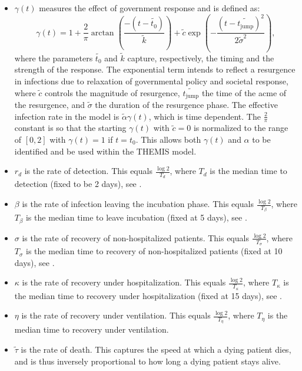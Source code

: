 \documentclass[msom,blindrev]{informs3} %
\begin{document}
\begin{APPENDICES}
\begin{itemize}[topsep=0pt,itemsep=0pt]
    \item $\gamma(t)$ measures the effect of government response and is defined as:
    \[\gamma(t)=1 + \frac{2}{\pi}\arctan\left(\frac{-(t-\widetilde{t_0})}{\widetilde{k}}\right) + \widetilde{c}\exp\left(-\frac{(t-\widetilde{t_\text{jump}})^2}{2\widetilde{\sigma}^2}\right), \]
    where the parameters $\widetilde{t_0}$ and $\widetilde{k}$ capture, respectively, the timing and the strength of the response. The exponential term intends to reflect a resurgence in infections due to relaxation of governmental policy and societal response, where $\widetilde{c}$ controls the magnitude of resurgence, $\widetilde{t_\text{jump}}$ the time of the acme of the resurgence, and $\widetilde{\sigma}$ the duration of the resurgence phase.  The effective infection rate in the model is $\widetilde{\alpha}\gamma(t)$, which is time dependent. The $\frac{2}{\pi}$ constant is so that the starting $\gamma(t)$ with $\widetilde{c}=0$ is normalized to the range of $[0,2]$ with $\gamma(t)=1$ if $t=t_0$. This allows both $\gamma(t)$ and $\alpha$ to be identified and be used within the THEMIS model. 
    \item $r_d$ is the rate of detection. This equals $\frac{\log 2}{T_{d}}$, where $T_{d}$ is the median time to detection (fixed to be 2 days), see  .
    \item $\beta$ is the rate of infection leaving the incubation phase. This equals $\frac{\log 2}{T_{\beta}}$, where $T_{\beta}$ is the median time to leave incubation (fixed at 5 days), see  .
    \item $\sigma$ is the rate of recovery of non-hospitalized patients. This equals $\frac{\log 2}{T_{\sigma}}$, where $T_{\sigma}$ is the median time to recovery of non-hospitalized patients  (fixed at 10 days), see .
    \item $\kappa$ is the rate of recovery under hospitalization.  This equals $\frac{\log 2}{T_{\kappa}}$, where $T_{\kappa}$ is the median time to recovery under hospitalization (fixed at 15 days), see .
    \item $\eta$ is the rate of recovery under ventilation. This equals $\frac{\log 2}{T_{\eta}}$, where $T_{\eta}$ is the median time to recovery under ventilation.
    \item $\widetilde{\tau}$ is the rate of death. This captures the speed at which a dying patient dies, and is thus inversely proportional to how long a dying patient stays alive.


\end{itemize}
\end{APPENDICES}
\end{document}
